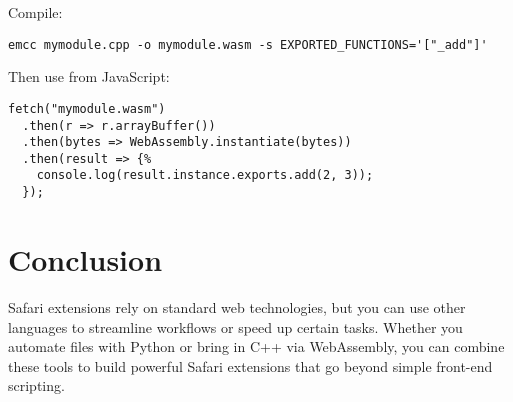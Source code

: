\documentclass[12pt,a4paper]{article}
\begin{document}
Compile:
\begin{verbatim}
emcc mymodule.cpp -o mymodule.wasm -s EXPORTED_FUNCTIONS='["_add"]'
\end{verbatim}

Then use from JavaScript:
\begin{verbatim}
fetch("mymodule.wasm")
  .then(r => r.arrayBuffer())
  .then(bytes => WebAssembly.instantiate(bytes))
  .then(result => {%
    console.log(result.instance.exports.add(2, 3));
  });
\end{verbatim}

\section{Conclusion}
Safari extensions rely on standard web technologies, but you can use other languages to streamline workflows or speed up certain tasks. Whether you automate files with Python or bring in C++ via WebAssembly, you can combine these tools to build powerful Safari extensions that go beyond simple front-end scripting.
\end{document}
